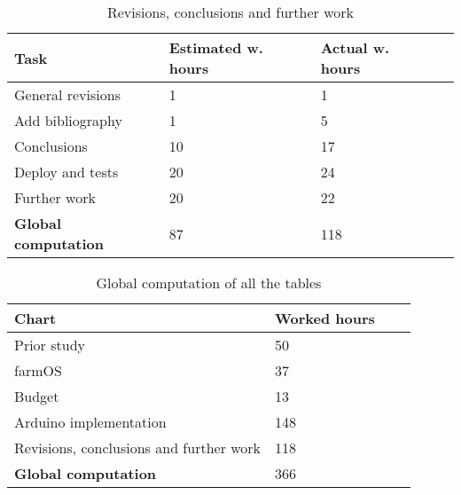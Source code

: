\begin{table}[H]
\caption{Revisions, conclusions and further work}
\begin{tabular}{llll}
\hline
\textbf{Task}    & \textbf{Estimated w. hours} & \textbf{Actual w. hours} \\ \hline
\rowcolor{lightgray}
General revisions                               & 1                           & 1                      \\
Add bibliography                                & 1                           & 5                      \\
\rowcolor{lightgray}
Conclusions                                     & 10                          & 17                     \\
Deploy and tests                                & 20                          & 24                      \\
\rowcolor{lightgray}
Further work                                    & 20                          & 22                      \\
\textbf{Global computation}                     & 87                          & 118                     \\
\end{tabular}
\end{table}

\begin{table}[H]
    \caption{Global computation of all the tables}
    \begin{tabular}{llll}
        \hline
        \textbf{Chart}    & \textbf{Worked hours} \\ \hline
        \rowcolor{lightgray}
        Prior study                                     & 50                                              \\
        farmOS                                          & 37                                              \\
        \rowcolor{lightgray}
        Budget                                          & 13                                             \\
        Arduino implementation                          & 148                                            \\
        \rowcolor{lightgray}
        Revisions, conclusions and further work         & 118                                             \\
        \textbf{Global computation}                     & 366                                             \\
    \end{tabular}
\end{table}

